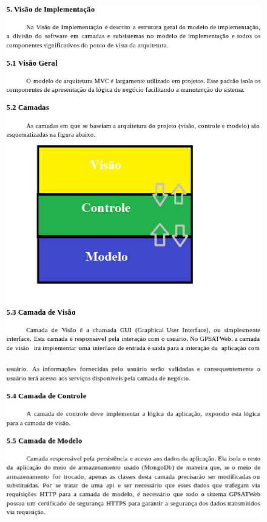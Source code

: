 \begin{apendicesenv}
\begin{figure}[H]
	\end{figure}
	\newpage
	\begin{figure}[H]
		    \label{fig31}
		        \includegraphics[keepaspectratio=true, scale=1]{editaveis/images/arqpag6.eps}
	\end{figure}
	\newpage
	\begin{figure}[H]
		    \label{fig32}
		        \includegraphics[keepaspectratio=true, scale=1]{editaveis/images/arqpag7.eps}
	\end{figure}
	


\cleardoublepage




\end{apendicesenv}
